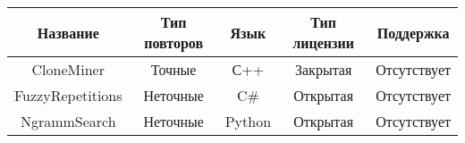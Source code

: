 \begin{minipage}{0.91\textwidth}
\begin{adjustbox}{center}
	\begin{tabular}{| c | c | c | c | c |}
	\hline
	\textbf{Название} & \textbf{Тип повторов} & \textbf{Язык} & \textbf{Тип лицензии} & \textbf{Поддержка} \\
	\hline 
	CloneMiner & Точные & С++ & Закрытая & Отсутствует \\
	\hline
	FuzzyRepetitions & Неточные & C\# & Открытая & Отсутствует \\
	\hline
	NgrammSearch & Неточные & Python & Открытая & Отсутствует \\
	\hline
\end{tabular}
\end{adjustbox}
\end{minipage}
